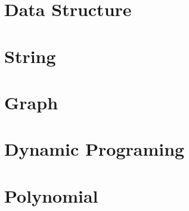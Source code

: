 \documentclass[a4paper,12pt,twoside,fontset=fandol,UTF8]{ctexbook}
\begin{document}
\chapter{Data Structure}

\chapter{String}

\chapter{Graph}

\chapter{Dynamic Programing}

\chapter{Polynomial}

\end{document}
